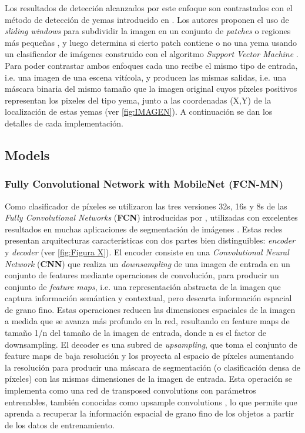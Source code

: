 \documentclass[a4paper,authoryear,review]{elsarticle}
\begin{document}
Los resultados de detección alcanzados por este enfoque son contrastados con el método de detección de yemas introducido en \citet{perez2017image}. Los autores proponen el uso de \emph{sliding windows} para subdividir la imagen en un conjunto de \emph{patches} o regiones más pequeñas \citep{perez2017image}, y luego determina si cierto patch contiene o no una yema usando un clasificador de imágenes construido con el algoritmo \emph{Support Vector Machine} \citep{vapnik2013nature}. Para poder contrastar ambos enfoques cada uno recibe el mismo tipo de entrada, i.e. una imagen de una escena vitícola, y producen las mismas salidas, i.e. una máscara binaria del mismo tamaño que la imagen original cuyos píxeles positivos representan los pixeles del tipo yema, junto a las coordenadas (X,Y) de la localización de estas yemas (ver \ref{fig:IMAGEN}). A continuación se dan los detalles de cada implementación.

\subsection{Models}
\subsubsection{Fully Convolutional Network with MobileNet (FCN-MN)} 
\label{sec:fcn}

Como clasificador de píxeles se utilizaron las tres versiones 32s, 16s y 8s de las \emph{Fully Convolutional Networks} (\textbf{FCN}) introducidas por \citet{long2015fully}, utilizadas con excelentes resultados en muchas aplicaciones de segmentación de imágenes \cite{litjens2017survey, garcia2018survey, kaymak2019brief}. Estas redes presentan arquitecturas características con dos partes bien distinguibles: \emph{encoder} y \emph{decoder} (ver \ref{fig:Figura X}). 
El encoder consiste en una \emph{Convolutional Neural Network} (\textbf{CNN}) que realiza un \emph{downsampling} de una imagen de entrada en un conjunto de features mediante operaciones de convolución, para producir un conjunto de \emph{feature maps}, i.e. una representación abstracta de la imagen que captura información semántica y contextual, pero descarta información espacial de grano fino. Estas operaciones reducen las dimensiones espaciales de la imagen a medida que se avanza más profundo en la red, resultando en feature maps de tamaño 1/n del tamaño de la imagen de entrada, donde n es el factor de downsampling. El decoder es una subred de \emph{upsampling}, que toma el conjunto de feature maps de baja resolución y los proyecta al espacio de píxeles aumentando la resolución para producir una máscara de segmentación (o clasificación densa de píxeles) con las mismas dimensiones de la imagen de entrada. Esta operación se implementa como una red de transposed convolutions con parámetros entrenables, también conocidas como upsample convolutions \citep{long2015fully, shelhamer2017fully}, lo que permite que aprenda a recuperar la información espacial de grano fino de los objetos a partir de los datos de entrenamiento. 
\end{document}
